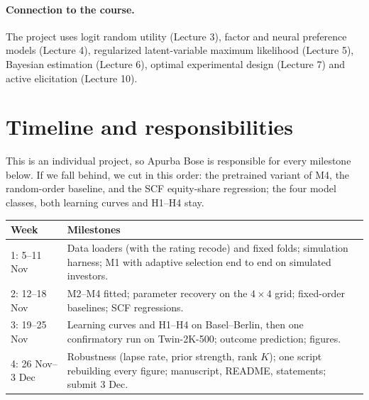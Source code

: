 \documentclass{article}
\begin{document}
\paragraph{Connection to the course.}
The project uses logit random utility (Lecture 3), factor and neural preference models (Lecture 4), regularized latent-variable maximum likelihood (Lecture 5), Bayesian estimation (Lecture 6), optimal experimental design (Lecture 7) and active elicitation (Lecture 10).

\section{Timeline and responsibilities}
This is an individual project, so Apurba Bose is responsible for every milestone below. If we fall behind, we cut in this order: the pretrained variant of M4, the random-order baseline, and the SCF equity-share regression; the four model classes, both learning curves and H1--H4 stay.

\begingroup
  \small\noindent
  \begin{tabularx}{\linewidth}{@{}lX@{}}
    \toprule
    Week & Milestones \\
    \midrule
    1: 5--11 Nov & Data loaders (with the rating recode) and fixed folds; simulation harness; M1 with adaptive selection end to end on simulated investors. \\
    2: 12--18 Nov & M2--M4 fitted; parameter recovery on the $4 \times 4$ grid; fixed-order baselines; SCF regressions. \\
    3: 19--25 Nov & Learning curves and H1--H4 on Basel--Berlin, then one confirmatory run on Twin-2K-500; outcome prediction; figures. \\
    4: 26 Nov--3 Dec & Robustness (lapse rate, prior strength, rank $K$); one script rebuilding every figure; manuscript, README, statements; submit 3 Dec. \\
    \bottomrule
  \end{tabularx}
\par\endgroup




\newpage

\end{document}
